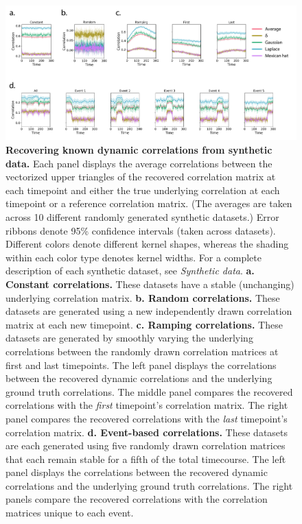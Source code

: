 \documentclass[english]{article}
\begin{document}
\begin{figure}[tp]
  \centering
  \includegraphics[width=\textwidth]{figs/synthetic_data.pdf}
  \caption{\textbf{Recovering known dynamic correlations from
      synthetic data.}  Each panel displays the average correlations between
    the vectorized upper triangles of the recovered correlation matrix
    at each timepoint and either the true underlying correlation at each timepoint or a
    reference correlation matrix.  (The averages are taken across 10
    different randomly generated synthetic datasets.) Error ribbons
    denote 95\% confidence intervals (taken across datasets). Different colors denote different
    kernel shapes, whereas the shading within each color type denotes
    kernel widths.  For a complete description of each synthetic
    dataset, see \textit{Synthetic data}.  \textbf{a. Constant
      correlations.} These datasets have a stable (unchanging)
    underlying correlation matrix.  \textbf{b. Random
      correlations.}  These datasets are generated using a new
    independently drawn correlation matrix at each new timepoint.  \textbf{c. Ramping
      correlations.}  These datasets are generated by smoothly varying
    the underlying correlations between the randomly drawn
    correlation matrices at first and last timepoints.  The left
    panel displays the correlations between the recovered dynamic
    correlations and the underlying ground truth correlations.  The
    middle panel compares the recovered correlations with the
    \textit{first} timepoint's correlation matrix.  The right panel
    compares the recovered correlations with the
    \textit{last} timepoint's correlation matrix.
    \textbf{d. Event-based correlations.}  These datasets are each
    generated using five randomly drawn correlation matrices that each
    remain stable for a fifth of the total timecourse.  The left panel
    displays the correlations between the recovered dynamic
    correlations and the underlying ground truth correlations.  The
    right panels compare the recovered correlations with the
    correlation matrices unique to each event.}
  \label{fig:synthetic_data}
\end{figure}
\end{document}
